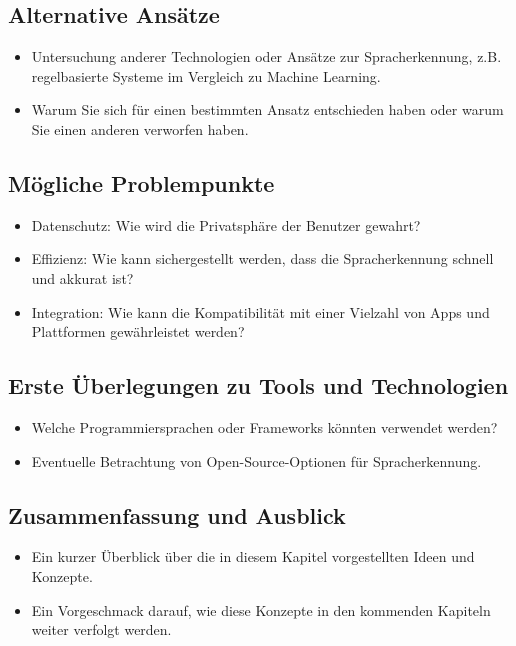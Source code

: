 \documentclass[11pt,a4paper]{article}
\begin{document}
\subsection{Alternative Ansätze}
\begin{itemize}
    \item Untersuchung anderer Technologien oder Ansätze zur Spracherkennung, z.B. regelbasierte Systeme im Vergleich zu Machine Learning.
    \item Warum Sie sich für einen bestimmten Ansatz entschieden haben oder warum Sie einen anderen verworfen haben.
\end{itemize}

\subsection{Mögliche Problempunkte}
\begin{itemize}
    \item Datenschutz: Wie wird die Privatsphäre der Benutzer gewahrt?
    \item Effizienz: Wie kann sichergestellt werden, dass die Spracherkennung schnell und akkurat ist?
    \item Integration: Wie kann die Kompatibilität mit einer Vielzahl von Apps und Plattformen gewährleistet werden?
\end{itemize}

\subsection{Erste Überlegungen zu Tools und Technologien}
\begin{itemize}
    \item Welche Programmiersprachen oder Frameworks könnten verwendet werden?
    \item Eventuelle Betrachtung von Open-Source-Optionen für Spracherkennung.
\end{itemize}

\subsection{Zusammenfassung und Ausblick}
\begin{itemize}
    \item Ein kurzer Überblick über die in diesem Kapitel vorgestellten Ideen und Konzepte.
    \item Ein Vorgeschmack darauf, wie diese Konzepte in den kommenden Kapiteln weiter verfolgt werden.
\end{itemize}
\end{document}
